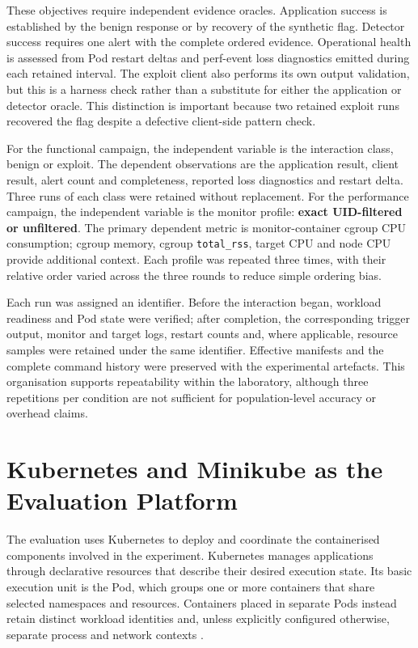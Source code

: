 These objectives require independent evidence oracles. Application success is
established by the benign response or by recovery of the synthetic flag.
Detector success requires one alert with the complete ordered evidence.
Operational health is assessed from Pod restart deltas and perf-event loss
diagnostics emitted during each retained interval. The exploit client also
performs its own output validation, but this is a harness check rather than a
substitute for either the application or detector oracle. This distinction is
important because two retained exploit runs recovered the flag despite a
defective client-side pattern check.

For the functional campaign, the independent variable is the interaction
class, benign or exploit. The dependent observations are the application
result, client result, alert count and completeness, reported loss diagnostics
and restart delta. Three runs of each class were retained without replacement.
For the performance campaign, the independent variable is the monitor profile:
\textbf{exact UID-filtered or unfiltered}. The primary dependent metric is
monitor-container cgroup CPU consumption; cgroup memory, cgroup
\texttt{total\_rss}, target CPU and node CPU provide additional context. Each
profile was repeated three times, with their relative order varied across the
three rounds to reduce simple ordering bias.

Each run was assigned an identifier. Before the interaction began, workload
readiness and Pod state were verified; after completion, the corresponding
trigger output, monitor and target logs, restart counts and, where applicable,
resource samples were retained under the same identifier. Effective manifests 
and the complete command history were preserved with the experimental artefacts. 
This organisation supports repeatability within the laboratory, although three 
repetitions per condition are not sufficient for population-level accuracy or overhead claims.

\section{Kubernetes and Minikube as the Evaluation Platform}
\label{sec:evaluation-kubernetes-minikube}

The evaluation uses Kubernetes to deploy and coordinate the containerised
components involved in the experiment. Kubernetes manages applications through
declarative resources that describe their desired execution state. Its basic
execution unit is the Pod, which groups one or more containers that share
selected namespaces and resources. Containers placed in separate Pods instead
retain distinct workload identities and, unless explicitly configured
otherwise, separate process and network contexts
\cite{kubernetes_pods,kubernetes_process_namespace}.

